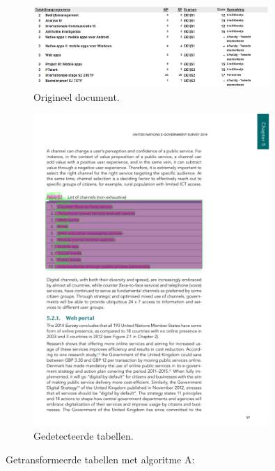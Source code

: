 \begin{figure}[H]
    \centering
    \includegraphics[width=0.8\textwidth]{test-resultaten/15/orignal.png}
    \caption{Origineel document.}
\end{figure}

\begin{figure}[H]
    \centering
    \includegraphics[width=0.8\textwidth]{test-resultaten/1/detected_tables.png}
    \caption{Gedetecteerde tabellen.}
\end{figure}

Getransformeerde tabellen met algoritme A:

